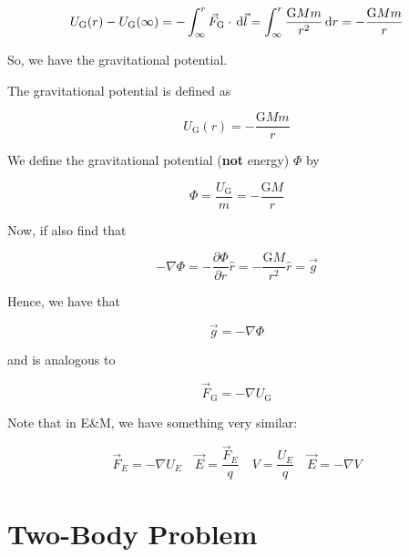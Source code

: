 \begin{equation}
	U_\mathrm{G}(r) - U_\mathrm{G}(\infty) = - \int_\infty^r \vec F_\mathrm{G} \cdot \D \vec l = \int_\infty^r \frac{\mathrm{G} M m}{r^2} \D r = - \frac{\mathrm{G} M m}{r}
\end{equation}

So, we have the gravitational potential.

\begin{definition}
	The gravitational potential is defined as
	
	\begin{equation}
		U_\mathrm{G}(r) = - \frac{\mathrm{G} M m}{r} 
	\end{equation}
\end{definition}

We define the gravitational potential (\textbf{not} energy) $\Phi$ by

\begin{equation}
	\Phi = \frac{U_\mathrm{G}}{m} = -\frac{\mathrm{G}M}{r}
\end{equation}

Now, if also find that

\begin{equation}
	- \nabla \Phi = - \frac{\partial \Phi}{\partial r} \hat r = - \frac{\mathrm{G}M}{r^2} \hat r = \vec g
\end{equation}

Hence, we have that

\begin{equation}
	\vec g = - \nabla \Phi
\end{equation}

and is analogous to

\begin{equation}
	\vec F_\mathrm{G} = - \nabla U_\mathrm{G}
\end{equation}

\begin{remark}
	Note that in E\&M, we have something very similar:

	\begin{equation}
		\vec F_E = - \nabla U_E \quad \vec E = \frac{\vec F_E}{q} \quad V = \frac{U_E}{q} \quad \vec E = - \nabla V
	\end{equation}
\end{remark}

\section{Two-Body Problem}

